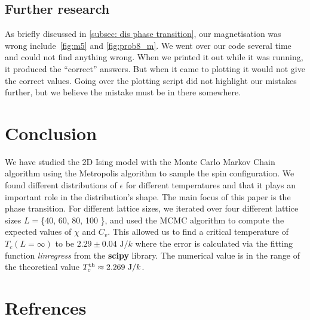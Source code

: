 \documentclass[english,notitlepage,reprint,nofootinbib]{revtex4-2}  %
\begin{document}
	\subsection{Further research}\label{sec:further-research}
	As briefly discussed in \autoref{subsec: dis phase transition}, our magnetisation was wrong include~\autoref{fig:m5} and \autoref{fig:prob8_m}.
	We went over our code several time and could not find anything wrong.
	When we printed it out while it was running, it produced the ``correct'' answers.
	But when it came to plotting it would not give the correct values.
	Going over the plotting script did not highlight our mistakes further, but we believe the mistake must be in there somewhere.


	
	\section{Conclusion}\label{sec:conclusion}
	We have studied the 2D Ising model with the Monte Carlo Markov Chain algorithm
	using the Metropolis algorithm to sample the spin configuration. We found different distributions of $\epsilon$ for different temperatures and that it plays
	an important role in the distribution's shape. The main focus of this paper is the
	phase transition. For different lattice sizes, we iterated over four different lattice
	sizes $L=$\{40, 60, 80, 100 \}, and used the MCMC algorithm to compute the expected values
	of $\chi$ and $C_v$. This allowed us to find a critical temperature of $T_c(L=\infty)$
	to be $ 2.29 \pm 0.04 \text{ J}/k $ where the error is calculated via the fitting function
	\textit{linregress} from the \textbf{scipy} library. The numerical value is in the range
	of the theoretical value $T_{c}^{\rm th} \approx 2.269 \text{ J}/k$.
	
	\onecolumngrid
	\section*{Refrences}
	
	
	
\end{document}
